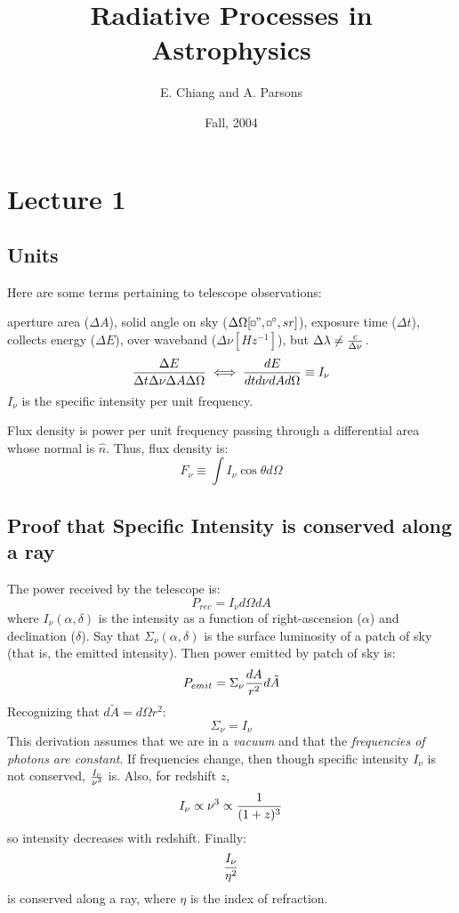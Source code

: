 \documentclass[11pt]{article}
\title{Radiative Processes in Astrophysics}
\author{E. Chiang and A. Parsons}
\date{Fall, 2004}
\def\^{\hat}
\def\inv#1{{1 \over #1}}
\def\sqr#1#2{{\vcenter{\vbox{\hrule height.#2pt
    \hbox{\vrule width.#2pt height#1pt \kern#1pt
        \vrule width.#2pt}
    \hrule height.#2pt}}}}
\def\square{\mathchoice\sqr34\sqr34\sqr{2.1}3\sqr{1.5}3}
\begin{document}
\maketitle

\section*{Lecture 1}

\subsection*{Units}

Here are some terms pertaining to telescope observations:\par
aperture area ($\Delta A$), solid angle on sky ($\Delta \Omega 
[\square ",\square^\circ , sr]$), exposure time ($\Delta t$), collects 
energy ($\Delta E$), over waveband ($\Delta \nu [Hz^{-1}]$), but 
$\Delta\lambda\ne {c\over \Delta\nu}$.
$${\Delta E\over\Delta t\Delta\nu\Delta A\Delta\Omega} \iff
{dE \over dt d\nu dA d\Omega} \equiv I_\nu$$
$I_\nu$ is the specific intensity per unit frequency.

Flux density is power per unit frequency passing through a 
differential area whose normal is $\^n$. Thus, flux density is:
$$\boxed{F_\nu\equiv\int I_\nu\cos\theta d\Omega}$$

\subsection*{ Proof that Specific Intensity is conserved along a ray }

The power received by the telescope is:
$$P_{rec}=I_\nu d\Omega dA$$
where
$I_\nu(\alpha,\delta )$ is the intensity as a function of right-ascension
($\alpha$) and declination ($\delta$).  Say that $\Sigma_\nu(\alpha,\delta)$ 
is the surface luminosity of a patch of sky (that is, the emitted intensity).
Then power emitted by patch of sky is:
$$P_{emit}=\Sigma_\nu{dA\over r^2}d\tilde A$$
Recognizing that $d\tilde A=d\Omega r^2$:
$$\Sigma_\nu=I_\nu$$
This derivation assumes that we are in a {\it vacuum} and that the 
{\it frequencies of photons are constant}.
If frequencies change, then though specific intensity $I_\nu$ is not conserved,
${I_\nu\over\nu^3}$ is.
Also, for redshift $z$,
$$I_\nu\propto\nu^3 \propto\inv{(1+z)^3}$$
so intensity decreases with redshift. Finally:
$${I_\nu\over\eta^2}$$
is conserved along a ray, where $\eta$ is the index of refraction.
\end{document}
